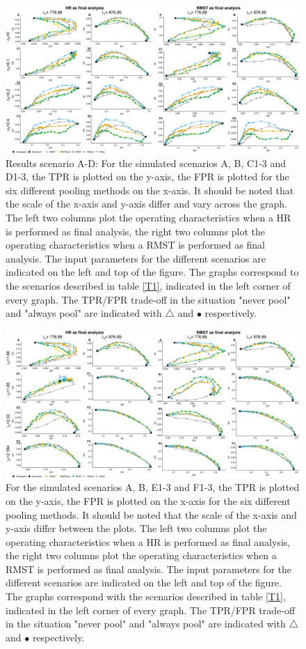 \documentclass[Royal,sagev,times]{sagej}
\begin{document}
\begin{figure}[h!]
\includegraphics[width=13cm]{1.Sim1.png}
  \caption{Results scenario A-D: For the simulated scenarios A, B, C1-3 and D1-3, the TPR is plotted on the y-axis, the FPR is plotted for the six different pooling methods on the x-axis. It should be noted that the scale of the x-axis and y-axis differ and vary across the graph. The left two columns plot the operating characteristics when a HR is performed as final analysis, the right two columns plot the operating characteristics when a RMST is performed as final analysis. The input parameters for the different scenarios are indicated on the left and top of the figure. The graphs correspond to the scenarios described in table \ref{T1}, indicated in the left corner of every graph. The TPR/FPR trade-off in the situation "never pool" and "always pool" are indicated with $\triangle$ and $\bullet$ respectively.}
  \label{fig:A-D}
\end{figure}

\begin{figure}[h!]
\includegraphics[width=13cm]{1.Sim2.png}
  \caption{For the simulated scenarios A, B, E1-3 and F1-3, the TPR is plotted on the y-axis, the FPR is plotted on the x-axis for the six different pooling methods. It should be noted that the scale of the x-axis and y-axis differ between the plots. The left two columns plot the operating characteristics when a HR is performed as final analysis, the right two columns plot the operating characteristics when a RMST is performed as final analysis. The input parameters for the different scenarios are indicated on the left and top of the figure. The graphs correspond with the scenarios described in table \ref{T1}, indicated in the left corner of every graph. The TPR/FPR trade-off in the situation "never pool" and "always pool" are indicated with $\triangle$ and $\bullet$ respectively.}
  \label{fig:Sim2}
\end{figure}
\end{document}
